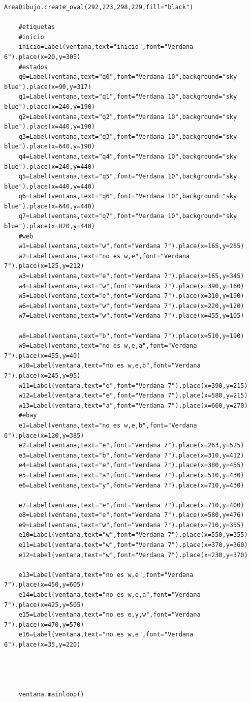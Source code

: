 \begin{lstlisting}[frame=single]
    AreaDibujo.create_oval(292,223,298,229,fill="black")

    #etiquetas
    #inicio
    inicio=Label(ventana,text="inicio",font="Verdana 6").place(x=20,y=305)
    #estados
    q0=Label(ventana,text="q0",font="Verdana 10",background="sky blue").place(x=90,y=317)
    q1=Label(ventana,text="q1",font="Verdana 10",background="sky blue").place(x=240,y=190)
    q2=Label(ventana,text="q2",font="Verdana 10",background="sky blue").place(x=440,y=190)
    q3=Label(ventana,text="q3",font="Verdana 10",background="sky blue").place(x=640,y=190)
    q4=Label(ventana,text="q4",font="Verdana 10",background="sky blue").place(x=240,y=440)
    q5=Label(ventana,text="q5",font="Verdana 10",background="sky blue").place(x=440,y=440)
    q6=Label(ventana,text="q6",font="Verdana 10",background="sky blue").place(x=640,y=440)
    q7=Label(ventana,text="q7",font="Verdana 10",background="sky blue").place(x=820,y=440)
    #web
    w1=Label(ventana,text="w",font="Verdana 7").place(x=165,y=285)
    w2=Label(ventana,text="no es w,e",font="Verdana 7").place(x=125,y=212)
    w3=Label(ventana,text="e",font="Verdana 7").place(x=165,y=345)
    w4=Label(ventana,text="w",font="Verdana 7").place(x=390,y=160)
    w5=Label(ventana,text="e",font="Verdana 7").place(x=310,y=190)
    w6=Label(ventana,text="w",font="Verdana 7").place(x=220,y=120)
    w7=Label(ventana,text="w",font="Verdana 7").place(x=455,y=105)

    w8=Label(ventana,text="b",font="Verdana 7").place(x=510,y=190)
    w9=Label(ventana,text="no es w,e,a",font="Verdana 7").place(x=455,y=40)
    w10=Label(ventana,text="no es w,e,b",font="Verdana 7").place(x=245,y=95)
    w11=Label(ventana,text="e",font="Verdana 7").place(x=390,y=215)
    w12=Label(ventana,text="e",font="Verdana 7").place(x=580,y=215)
    w13=Label(ventana,text="a",font="Verdana 7").place(x=660,y=270)
    #ebay
    e1=Label(ventana,text="no es w,e,b",font="Verdana 6").place(x=120,y=385)
    e2=Label(ventana,text="e",font="Verdana 7").place(x=263,y=525)
    e3=Label(ventana,text="b",font="Verdana 7").place(x=310,y=412)
    e4=Label(ventana,text="e",font="Verdana 7").place(x=380,y=455)
    e5=Label(ventana,text="a",font="Verdana 7").place(x=510,y=430)
    e6=Label(ventana,text="y",font="Verdana 7").place(x=710,y=430)

    e7=Label(ventana,text="e",font="Verdana 7").place(x=710,y=400)
    e8=Label(ventana,text="e",font="Verdana 7").place(x=580,y=476)
    e9=Label(ventana,text="w",font="Verdana 7").place(x=710,y=355)
    e10=Label(ventana,text="w",font="Verdana 7").place(x=550,y=355)
    e11=Label(ventana,text="w",font="Verdana 7").place(x=370,y=360)
    e12=Label(ventana,text="w",font="Verdana 7").place(x=230,y=370)

    e13=Label(ventana,text="no es w,e",font="Verdana 7").place(x=450,y=605)
    e14=Label(ventana,text="no es w,e,a",font="Verdana 7").place(x=425,y=505)
    e15=Label(ventana,text="no es e,y,w",font="Verdana 7").place(x=470,y=570)
    e16=Label(ventana,text="no es w,e",font="Verdana 6").place(x=35,y=220)




    ventana.mainloop()	
	
\end{lstlisting}

